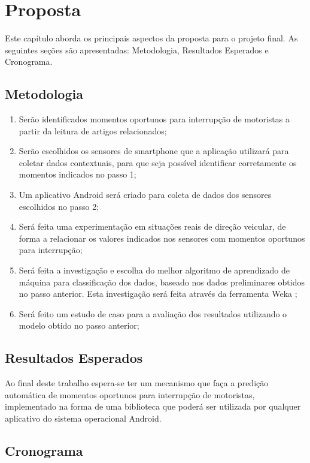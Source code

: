 \chapter{Proposta}
\label{proposta}
Este capítulo aborda os principais aspectos da proposta para o projeto final. As seguintes seções são apresentadas:
Metodologia, Resultados Esperados e Cronograma.

\section{Metodologia}
\label{metodologia}

\begin{enumerate}
  \item Serão identificados momentos oportunos para interrupção de motoristas a partir da leitura de artigos
relacionados;
  \item Serão escolhidos os sensores de smartphone que a aplicação utilizará para coletar dados contextuais, para
que seja possível identificar corretamente os momentos indicados no passo 1;
  \item Um aplicativo Android será criado para coleta de dados dos sensores escolhidos no passo 2;
  \item Será feita uma experimentação em situações reais de direção veicular, de forma a relacionar os valores indicados
nos sensores com momentos oportunos para interrupção;
  \item Será feita a investigação e escolha do melhor algoritmo de aprendizado de máquina para classificação dos dados,
baseado nos dados preliminares obtidos no passo anterior. Esta investigação será feita através da ferramenta Weka
\cite{hall2009weka};
  \item Será feito um estudo de caso para a avaliação dos resultados utilizando o modelo obtido no passo anterior;
\end{enumerate}

\section{Resultados Esperados}
\label{resultados}

Ao final deste trabalho espera-se ter um mecanismo que faça a predição automática de momentos oportunos para
interrupção de motoristas, implementado na forma de uma biblioteca que poderá ser utilizada por qualquer aplicativo
do sistema operacional Android.

\section{Cronograma}
\label{cronograma}

